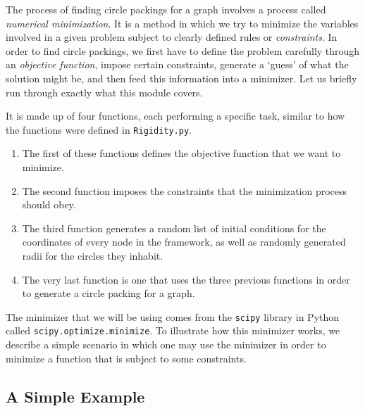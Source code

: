 \begin{flushleft}
The process of finding circle packings for a graph involves a process called \textit{numerical minimization}. It is a method in which we try to minimize the variables involved in a given problem subject to clearly defined rules or \textit{constraints}. In order to find circle packings, we first have to define the problem carefully through an \textit{objective function}, impose certain constraints, generate a `guess' of what the solution might be, and then feed this information into a minimizer. Let us briefly run through exactly what this module covers. 
\end{flushleft}

\begin{flushleft}
It is made up of four functions, each performing a specific task, similar to how the functions were defined in \texttt{Rigidity.py}. 
\begin{enumerate}
    \item The first of these functions defines the objective function that we want to minimize.
    \vspace{-3mm}
    \item The second function imposes the constraints that the minimization process should obey. 
    \vspace{-3mm}
    \item The third function generates a random list of initial conditions for the coordinates of every node in the framework, as well as randomly generated radii for the circles they inhabit.
    \vspace{-3mm}
    \item The very last function is one that uses the three previous functions in order to generate a circle packing for a graph.
\end{enumerate}
\end{flushleft}

\begin{flushleft}
The minimizer that we will be using comes from the \texttt{scipy} \cite{scipy} library in Python called \texttt{scipy.optimize.minimize}. To illustrate how this minimizer works, we describe a simple scenario in which one may use the minimizer in order to minimize a function that is subject to some constraints.
\end{flushleft}

\subsection{A Simple Example}

